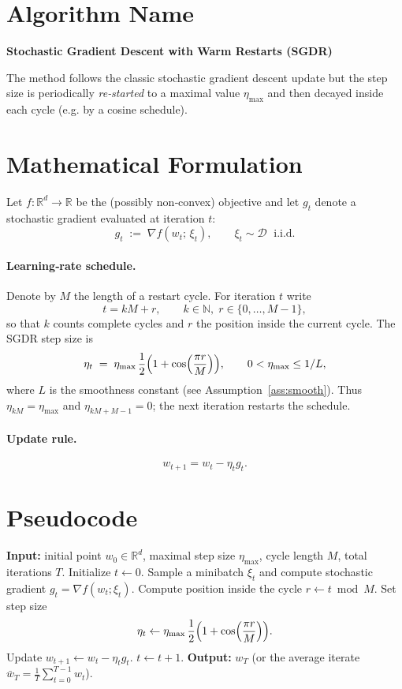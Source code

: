 \documentclass[11pt]{article}
\newcommand{\R}{\mathbb{R}}
\begin{document}
\section*{Algorithm Name}
\textbf{Stochastic Gradient Descent with Warm Restarts (SGDR)}  

The method follows the classic stochastic gradient descent update but the step size is
periodically \emph{re‑started} to a maximal value $\eta_{\max}$ and then decayed
inside each cycle (e.g. by a cosine schedule).  

\section*{Mathematical Formulation}
Let $f:\R^{d}\to\R$ be the (possibly non‑convex) objective and let $g_t$ denote a
stochastic gradient evaluated at iteration $t$:
\[
g_t \;:=\; \nabla f(w_t;\,\xi_t),\qquad 
\xi_t\sim\mathcal{D}\;\text{ i.i.d.}
\]

\paragraph{Learning‑rate schedule.}
Denote by $M$ the length of a restart cycle. For iteration $t$ write
\[
t = kM + r,\qquad k\in\mathbb N,\; r\in\{0,\dots,M-1\},
\]
so that $k$ counts complete cycles and $r$ the position inside the current
cycle. The SGDR step size is
\begin{equation}\label{eq:eta}
\eta_t \;=\; \eta_{\max}\,
\frac{1}{2}\Bigl(1+\cos\Bigl(\frac{\pi r}{M}\Bigr)\Bigr),
\qquad
0<\eta_{\max}\le 1/L,
\end{equation}
where $L$ is the smoothness constant (see Assumption~\ref{ass:smooth}).
Thus $\eta_{kM}= \eta_{\max}$ and $\eta_{kM+M-1}=0$; the next iteration
restarts the schedule.

\paragraph{Update rule.}
\begin{equation}\label{eq:update}
w_{t+1}= w_t - \eta_t g_t .
\end{equation}

\section*{Pseudocode}
\begin{algorithm}[H]
\caption{SGDR}
\begin{algorithmic}[1]
\State \textbf{Input:} initial point $w_0\in\R^d$, maximal step size $\eta_{\max}$,
cycle length $M$, total iterations $T$.
\State Initialize $t\gets0$.
    \State Sample a minibatch $\xi_t$ and compute stochastic gradient $g_t=\nabla f(w_t;\xi_t)$.
    \State Compute position inside the cycle $r \gets t \bmod M$.
    \State Set step size 
    \[
    \eta_t \gets \eta_{\max}\,\frac12\Bigl(1+\cos\Bigl(\frac{\pi r}{M}\Bigr)\Bigr).
    \]
    \State Update $w_{t+1}\gets w_t-\eta_t g_t$.
    \State $t\gets t+1$.
\EndWhile
\State \textbf{Output:} $w_T$ (or the average iterate $\bar w_T=\tfrac1T\sum_{t=0}^{T-1}w_t$).
\end{algorithmic}
\end{algorithm}
\end{document}
